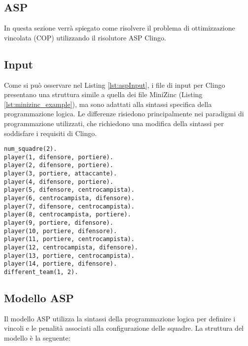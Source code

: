\documentclass{article}
\begin{document}
\begin{multicols*}{2}
\newpage

\section{ASP}
In questa sezione verrà spiegato come risolvere il problema di ottimizzazione vincolata (COP) utilizzando il risolutore ASP Clingo.

\subsection{Input}
Come si può osservare nel Listing \ref{lst:aspInput}, 
i file di input per Clingo presentano una struttura simile a quella dei file MiniZinc (Listing \ref{lst:minizinc_example}), 
ma sono adattati alla sintassi specifica della programmazione logica. 
Le differenze risiedono principalmente nei paradigmi di programmazione utilizzati, 
che richiedono una modifica della sintassi per soddisfare i requisiti di Clingo.

\begin{lstlisting}[style=minizinc, caption={ASP Input}, label={lst:aspInput}]
num_squadre(2).
player(1, difensore, portiere).
player(2, difensore, portiere).
player(3, portiere, attaccante).
player(4, difensore, portiere).
player(5, difensore, centrocampista).
player(6, centrocampista, difensore).
player(7, difensore, centrocampista).
player(8, centrocampista, portiere).
player(9, portiere, difensore).
player(10, portiere, difensore).
player(11, portiere, centrocampista).
player(12, centrocampista, difensore).
player(13, portiere, centrocampista).
player(14, portiere, difensore).
different_team(1, 2).
\end{lstlisting}

\subsection{Modello ASP}
Il modello ASP utilizza la sintassi della programmazione logica per definire i vincoli e le penalità associati alla configurazione delle squadre. La struttura del modello è la seguente:


\end{multicols*}
\end{document}
